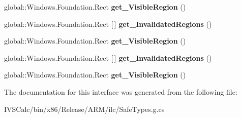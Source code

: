 \begin{DoxyCompactItemize}
global\+::\+Windows.\+Foundation.\+Rect {\bfseries get\+\_\+\+Visible\+Region} ()
\item 
\mbox{\label{interface_microsoft_1_1_graphics_1_1_canvas_1_1_u_i_1_1_xaml_1_1_i_canvas_regions_invalidated_event_args_a8bdfece13ba41751d3240b8e30222b26}} 
global\+::\+Windows.\+Foundation.\+Rect \mbox{[}$\,$\mbox{]} {\bfseries get\+\_\+\+Invalidated\+Regions} ()
\item 
\mbox{\label{interface_microsoft_1_1_graphics_1_1_canvas_1_1_u_i_1_1_xaml_1_1_i_canvas_regions_invalidated_event_args_aa5f10977b68c68dd22bda9524a1a75bd}} 
global\+::\+Windows.\+Foundation.\+Rect {\bfseries get\+\_\+\+Visible\+Region} ()
\item 
\mbox{\label{interface_microsoft_1_1_graphics_1_1_canvas_1_1_u_i_1_1_xaml_1_1_i_canvas_regions_invalidated_event_args_a8bdfece13ba41751d3240b8e30222b26}} 
global\+::\+Windows.\+Foundation.\+Rect \mbox{[}$\,$\mbox{]} {\bfseries get\+\_\+\+Invalidated\+Regions} ()
\item 
\mbox{\label{interface_microsoft_1_1_graphics_1_1_canvas_1_1_u_i_1_1_xaml_1_1_i_canvas_regions_invalidated_event_args_aa5f10977b68c68dd22bda9524a1a75bd}} 
global\+::\+Windows.\+Foundation.\+Rect {\bfseries get\+\_\+\+Visible\+Region} ()
\end{DoxyCompactItemize}


The documentation for this interface was generated from the following file\+:\begin{DoxyCompactItemize}
\item 
I\+V\+S\+Calc/bin/x86/\+Release/\+A\+R\+M/ilc/Safe\+Types.\+g.\+cs\end{DoxyCompactItemize}
